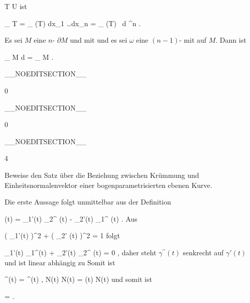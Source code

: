 {{\mavergleichskette
{\vergleichskette
{ T
}
{ \subseteq }{ U
}
{  }{
}
{    }{
}
{   }{
}
}
{}{}{}
ist

\mavergleichskettedisp
{\vergleichskette
{
\int_{  T   }  \omega
}
{ =} {
\int_{ \alpha(T)  }    dx_1 \wedge \ldots \wedge dx_n
}
{ =} { \int_{ \alpha(T)  }       \,  d \lambda^n
}
{ } {
}
{ } {
}
}
{}{}{.}}{Es sei $M$ eine
$n$-
$\partial M$ und mit
und es sei $\omega$ eine
$(n-1)$-
mit
 auf $M$. Dann ist

\mavergleichskettedisp
{\vergleichskette
{
\int_{ M  }  d\omega
}
{ =} {
\int_{ \partial M  }  \omega
}
{ } {
}
{ } {
}
{ } {
}
}
{}{}{.}}

 }

__NOEDITSECTION__

{0}

{

}
{  }

__NOEDITSECTION__

{0}

{

}
{  }

__NOEDITSECTION__

{4}

{

Beweise den Satz über die Beziehung zwischen Krümmung und Einheitsnormalenvektor einer bogenparametrisierten ebenen Kurve.

}
{

Die erste Aussage folgt unmittelbar aus der Definition

\mavergleichskettedisp
{\vergleichskette
{ \kappa(t)
}
{ =} { \gamma_1'(t) \gamma_2^{\prime \prime} (t) - \gamma_2'(t) \gamma_1^{\prime \prime} (t)
}
{ } {
}
{ } {
}
{ } {
}
}
{}{}{.}
Aus

\mavergleichskettedisp
{\vergleichskette
{ \left(  \gamma_1'(t)  \right)^2 +  \left(  \gamma_2' (t)  \right)^2
}
{ =} { 1
}
{ } {
}
{ } {
}
{ } {
}
}
{}{}{}
folgt

\mavergleichskettedisp
{\vergleichskette
{ \gamma_1'(t) \gamma_1^{\prime \prime}(t) + \gamma_2'(t) \gamma_2^{\prime \prime} (t)
}
{ =} { 0
}
{ } {
}
{ } {
}
{ } {
}
}
{}{}{,}
daher steht $\gamma^{\prime \prime}(t)$ senkrecht auf $\gamma'(t)$ und ist linear abhängig zu
 Somit ist

\mavergleichskettedisp
{\vergleichskette
{ \gamma^{\prime \prime}(t)
}
{ =} { \left\langle  \gamma^{\prime \prime}(t) ,  N(t)  \right\rangle  N(t)
}
{ =} { \kappa(t) N(t)
}
{ } {
}
{ } {
}
}
{}{}{}
und somit ist

\mavergleichskettedisp
{\vergleichskette
{  \Vert
}
{ =} { 
}
{ } {
}
{ } {
}
{ } {
}
}
{}{}{.}

 }

